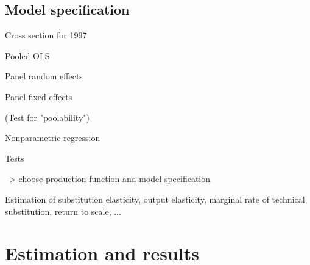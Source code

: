\documentclass[12pt,a4paper]{article}\usepackage[]{graphicx}\usepackage[]{color}
\begin{document}
\subsection{Model specification}








Cross section for 1997

Pooled OLS

Panel random effects

Panel fixed effects

(Test for "poolability")

Nonparametric regression

Tests

--> choose production function and model specification

Estimation of substitution elasticity, output elasticity, marginal rate of technical substitution, return to scale, ...












\section{Estimation and results}
\end{document}
